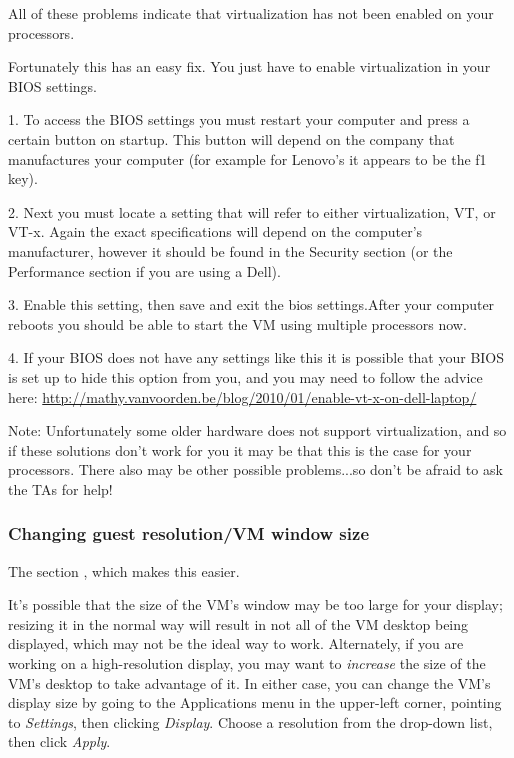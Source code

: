 \documentclass[letterpaper,10pt,english]{sphinxmanual}
\begin{document}
All of these problems indicate that virtualization has not been enabled on your processors.

Fortunately this has an easy fix. You just have to enable virtualization in your BIOS
settings.

1. To  access the BIOS settings you must restart your computer and press a certain
button on startup. This button will depend on the company that manufactures your computer
(for example for Lenovo's it appears to be the f1 key).

2. Next you must locate a setting that will refer to either virtualization, VT, or VT-x.
Again the exact specifications will depend on the computer's manufacturer, however
it should be found in the Security section (or the Performance section if you are using a Dell).

3. Enable this setting,
then save and exit the bios settings.After your computer reboots you should be able to start the VM using multiple processors now.

4. If your BIOS does not have any settings like this it is possible that your BIOS is set up to hide this option from you, and you
may need to follow the advice here: \url{http://mathy.vanvoorden.be/blog/2010/01/enable-vt-x-on-dell-laptop/}

Note: Unfortunately some older hardware does not support virtualization, and so if these solutions don't work for you it may
be that this is the case for your processors. There also may be other possible problems...so don't be afraid to ask the TAs for help!


\subsubsection{Changing guest resolution/VM window size}
\label{2013/vm:changing-guest-resolution-vm-window-size}



The section {\hyperref[vm:vm\string-additions]{}}, which makes this easier.



It's possible that the size of the VM's window may be too large for
your display; resizing it in the normal way will result in not all of
the VM desktop being displayed, which may not be the ideal way to
work.  Alternately, if you are working on a high-resolution display,
you may want to \emph{increase} the size of the VM's desktop to take
advantage of it.  In either case, you can change the VM's display size
by going to the Applications menu in the upper-left corner, pointing to
\emph{Settings}, then clicking \emph{Display}.  Choose a resolution from the
drop-down list, then click \emph{Apply}.
\end{document}
